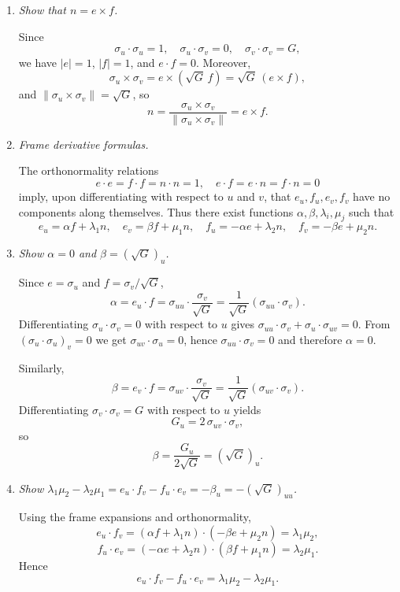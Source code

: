 \documentclass[12pt,a4paper]{article}
\theoremstyle{plain}
\theoremstyle{definition}      %
\begin{document}
	\begin{enumerate}
		\item \emph{Show that $n=e\times f$.}
		
		Since
		\[
		\sigma_u\cdot\sigma_u=1,\quad
		\sigma_u\cdot\sigma_v=0,\quad
		\sigma_v\cdot\sigma_v=G,
		\]
		we have $|e|=1$, $|f|=1$, and $e\cdot f=0$.
		Moreover,
		\[
		\sigma_u\times\sigma_v
		= e\times(\sqrt{G}\,f)
		= \sqrt{G}\,(e\times f),
		\]
		and $\|\sigma_u\times\sigma_v\|=\sqrt{G}$, so
		\[
		n = \frac{\sigma_u\times\sigma_v}{\|\sigma_u\times\sigma_v\|}
		= e\times f.
		\]
		
		\item \emph{Frame derivative formulas.}
		
		The orthonormality relations
		\[
		e\cdot e = f\cdot f = n\cdot n = 1,\quad
		e\cdot f = e\cdot n = f\cdot n = 0
		\]
		imply, upon differentiating with respect to $u$ and $v$, that
		$e_u,f_u,e_v,f_v$ have no components along themselves. Thus there exist
		functions $\alpha,\beta,\lambda_i,\mu_j$ such that
		\[
		e_u = \alpha f + \lambda_1 n,\quad
		e_v = \beta f + \mu_1 n,\quad
		f_u = -\alpha e + \lambda_2 n,\quad
		f_v = -\beta e + \mu_2 n.
		\]
		
		\item \emph{Show $\alpha=0$ and $\beta=(\sqrt{G})_u$.}
		
		Since $e=\sigma_u$ and $f=\sigma_v/\sqrt{G}$,
		\[
		\alpha = e_u\cdot f
		= \sigma_{uu}\cdot\frac{\sigma_v}{\sqrt{G}}
		= \frac{1}{\sqrt{G}}(\sigma_{uu}\cdot\sigma_v).
		\]
		Differentiating $\sigma_u\cdot\sigma_v=0$ with respect to $u$ gives
		$\sigma_{uu}\cdot\sigma_v + \sigma_u\cdot\sigma_{uv}=0$.
		From $(\sigma_u\cdot\sigma_u)_v=0$ we get $\sigma_{uv}\cdot\sigma_u=0$,
		hence $\sigma_{uu}\cdot\sigma_v=0$ and therefore $\alpha=0$.
		
		Similarly,
		\[
		\beta = e_v\cdot f
		= \sigma_{uv}\cdot\frac{\sigma_v}{\sqrt{G}}
		= \frac{1}{\sqrt{G}}(\sigma_{uv}\cdot\sigma_v).
		\]
		Differentiating $\sigma_v\cdot\sigma_v = G$ with respect to $u$ yields
		\[
		G_u = 2\,\sigma_{uv}\cdot\sigma_v,
		\]
		so
		\[
		\beta = \frac{G_u}{2\sqrt{G}} = (\sqrt{G})_u.
		\]
		
		\item \emph{Show $\lambda_1\mu_2-\lambda_2\mu_1
			= e_u\cdot f_v - f_u\cdot e_v
			= -\beta_u
			= -(\sqrt{G})_{uu}$.}
		
		Using the frame expansions and orthonormality,
		\[
		e_u\cdot f_v
		= (\alpha f + \lambda_1 n)\cdot(-\beta e + \mu_2 n)
		= \lambda_1\mu_2,
		\]
		\[
		f_u\cdot e_v
		= (-\alpha e + \lambda_2 n)\cdot(\beta f + \mu_1 n)
		= \lambda_2\mu_1.
		\]
		Hence
		\[
		e_u\cdot f_v - f_u\cdot e_v
		= \lambda_1\mu_2-\lambda_2\mu_1.
		\]
		

\end{enumerate}
\end{document}
